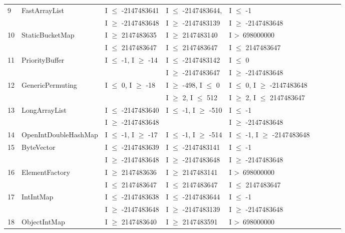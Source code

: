 {\begin{longtable}{|l|l|l|l|l|l|l|l|l|}
9	& FastArrayList				& I $\le$ -2147483641 			& I $\le$ -2147483644, 			& I $\le$ -1								\\ 
	&                                             & I $\ge$ -2147483648			& I $\ge$ -2147483139			& I $\ge$ -2147483648				\\	
10	& StaticBucketMap			& I $\ge$ 2147483635			& I $\ge$ 2147483140			& I \textgreater~698000000					\\ 
	&                                             & I $\le$ 2147483647			& I $\le$ 2147483647			& I $\le$ 2147483647			   		\\	
11	& PriorityBuffer				& I $\le$ -1, I $\ge$ -14			& I $\le$  -2147483142			& I $\le$ 0								\\
	&                                             & 								& I $\ge$ -2147483647			& I $\ge$ -2147483648			   	\\	 
12	& GenericPermuting			& I $\le$ 0, I $\ge$ -18			& I $\ge$ -498, I $\le$ 0			& I $\le$ 0, I $\ge$ -2147483648	\\ 	%
	&                                             & 								& I $\ge$ 2, I $\le$ 512			& I $\ge$ 2, I $\le$ 2147483647	\\
13	& LongArrayList				& I $\le$ -2147483640			& I $\le$ -1, I $\ge$ -510			& I $\le$ -1								\\ 
	&                                             & I $\ge$ -2147483648			& 								& I $\ge$ -2147483648				\\
14	& OpenIntDoubleHashMap	& I $\le$ -1, I $\ge$ -17			& I $\le$ -1, I $\ge$ -514			& I $\le$ -1, I $\ge$ -2147483648	\\ 
15	& ByteVector					& I $\le$ -2147483639			& I $\le$ -2147483141			& I $\le$ -1								\\ 	%
	&                                             & I $\ge$ -2147483648			& I $\ge$ -2147483648			& I $\ge$ -2147483648				\\	
16	& ElementFactory				& I $\ge$ 2147483636			& I $\ge$ 2147483141			& I \textgreater~698000000					\\ 
	&                                             & I $\le$ 2147483647			& I $\le$ 2147483647			& I $\le$ 2147483647  					\\	
17	& IntIntMap					& I $\le$ -2147483638			& I $\le$ -2147483644			& I $\le$ -1								\\ 
	&                                             & I $\ge$ -2147483648			& I $\ge$ -2147483139			& I $\ge$ -2147483648 				\\	
18	& ObjectIntMap				& I $\ge$ 2147483640			& I $\ge$ 2147483591			& I \textgreater~698000000					\\ 

\end{longtable}}
